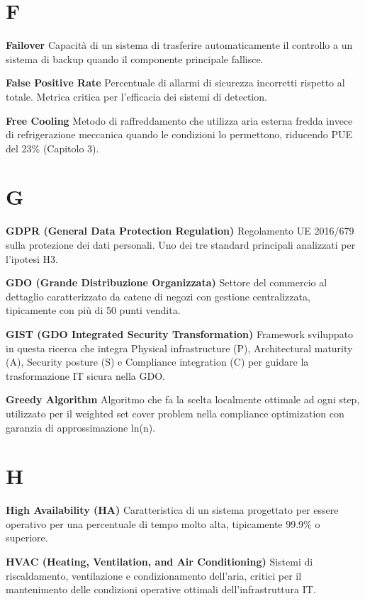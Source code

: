 \documentclass[12pt,a4paper,oneside]{book}
\numberwithin{figure}{chapter} %
\numberwithin{table}{chapter}  %
\begin{document}
\section{F}\label{f}

\textbf{Failover} Capacità di un sistema di trasferire automaticamente
il controllo a un sistema di backup quando il componente principale
fallisce.

\textbf{False Positive Rate} Percentuale di allarmi di sicurezza
incorretti rispetto al totale. Metrica critica per l'efficacia dei
sistemi di detection.

\textbf{Free Cooling} Metodo di raffreddamento che utilizza aria esterna
fredda invece di refrigerazione meccanica quando le condizioni lo
permettono, riducendo PUE del 23\% (Capitolo 3).

\section{G}\label{g}

\textbf{GDPR (General Data Protection Regulation)} Regolamento UE
2016/679 sulla protezione dei dati personali. Uno dei tre standard
principali analizzati per l'ipotesi H3.

\textbf{GDO (Grande Distribuzione Organizzata)} Settore del commercio al
dettaglio caratterizzato da catene di negozi con gestione centralizzata,
tipicamente con più di 50 punti vendita.

\textbf{GIST (GDO Integrated Security Transformation)} Framework
sviluppato in questa ricerca che integra Physical infrastructure (P),
Architectural maturity (A), Security posture (S) e Compliance
integration (C) per guidare la trasformazione IT sicura nella GDO.

\textbf{Greedy Algorithm} Algoritmo che fa la scelta localmente ottimale
ad ogni step, utilizzato per il weighted set cover problem nella
compliance optimization con garanzia di approssimazione ln(n).

\section{H}\label{h}

\textbf{High Availability (HA)} Caratteristica di un sistema progettato
per essere operativo per una percentuale di tempo molto alta,
tipicamente 99.9\% o superiore.

\textbf{HVAC (Heating, Ventilation, and Air Conditioning)} Sistemi di
riscaldamento, ventilazione e condizionamento dell'aria, critici per il
mantenimento delle condizioni operative ottimali dell'infrastruttura IT.
\end{document}
